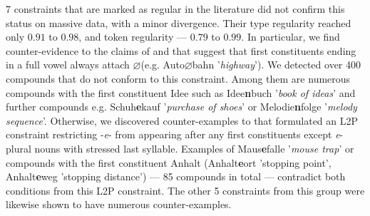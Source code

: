 \documentclass[10pt, a4paper]{article}
\newcommand{\zeroLinker}{\ensuremath{\boldsymbol{\varnothing}}}
\begin{document}
7 constraints that are marked as regular in the literature did not confirm this status on massive data, with a minor divergence. Their type regularity reached only $0.91$ to $0.98$, and token regularity --- $0.79$ to $0.99$. In particular, we find counter-evidence to the claims of \citet[110]{kuerschner_2005} and \citet[9]{schaefer_pankratz_2018} that suggest that first constituents ending in a full vowel always attach \zeroLinker (e.g. Auto{\zeroLinker}bahn '\textit{highway}'). We detected over 400 compounds that do not conform to this constraint. Among them are numerous compounds with the first constituent Idee such as Idee\textbf{n}buch '\textit{book of ideas}' and further compounds e.g. Schuh\textbf{e}kauf '\textit{purchase of shoes}' or Melodie\textbf{n}folge '\textit{melody sequence}'. Otherwise, we discovered counter-examples to \citet[18]{kuerschner_2010} that formulated an L2P constraint restricting -\textit{e}- from appearing after any first constituents except \textit{e}-plural nouns with stressed last syllable. Examples of Maus\textbf{e}falle '\textit{mouse trap}' or compounds with the first constituent Anhalt (Anhalt\textbf{e}ort 'stopping point', Anhalt\textbf{e}weg 'stopping distance') --- 85 compounds in total --- contradict both conditions from this L2P constraint. The other 5 constraints from this group were likewise shown to have numerous counter-examples.
\end{document}
